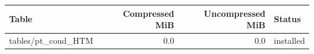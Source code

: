 {\small
\begin{tabular}{lrrl}
\hline
Table & Compressed MiB & Uncompressed MiB & Status \\
\hline
tables/pt\_coud\_HTM & 0.0 & 0.0 & installed \\
\hline
\end{tabular}
}
